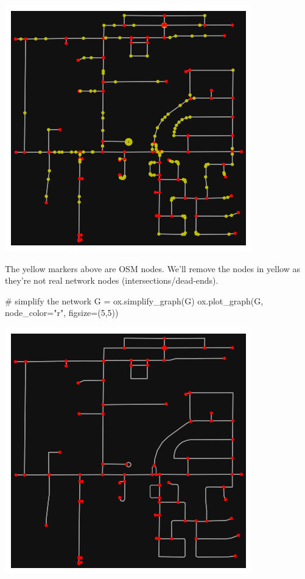 \documentclass[
  letterpaper,
  DIV=11,
  numbers=noendperiod]{scrreprt}
\newenvironment{Shaded}{\begin{snugshade}}{\end{snugshade}}
\newcommand{\CommentTok}[1]{\textcolor[rgb]{0.37,0.37,0.37}{#1}}
\newcommand{\DecValTok}[1]{\textcolor[rgb]{0.68,0.00,0.00}{#1}}
\newcommand{\NormalTok}[1]{\textcolor[rgb]{0.00,0.23,0.31}{#1}}
\newcommand{\OperatorTok}[1]{\textcolor[rgb]{0.37,0.37,0.37}{#1}}
\newcommand{\StringTok}[1]{\textcolor[rgb]{0.13,0.47,0.30}{#1}}
\begin{document}
\includegraphics{labs/w07_OSM_files/figure-pdf/cell-16-output-1.png}

The yellow markers above are OSM nodes. We'll remove the nodes in yellow
as they're not real network nodes (intersections/dead-ends).

\begin{Shaded}
\begin{Highlighting}[]
\CommentTok{\# simplify the network}
\NormalTok{G }\OperatorTok{=}\NormalTok{ ox.simplify\_graph(G)}
\NormalTok{ox.plot\_graph(G, node\_color}\OperatorTok{=}\StringTok{"r"}\NormalTok{, figsize}\OperatorTok{=}\NormalTok{(}\DecValTok{5}\NormalTok{,}\DecValTok{5}\NormalTok{))}
\end{Highlighting}
\end{Shaded}

\includegraphics{labs/w07_OSM_files/figure-pdf/cell-17-output-1.png}
\end{document}
